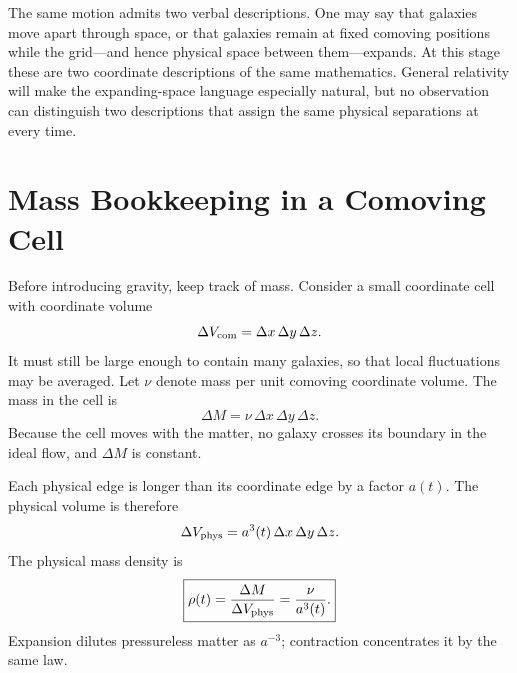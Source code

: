 \begin{classroomqa}
\end{classroomqa}

The same motion admits two verbal descriptions. One may say that galaxies move apart through space, or that galaxies remain at fixed comoving positions while the grid---and hence physical space between them---expands. At this stage these are two coordinate descriptions of the same mathematics. General relativity will make the expanding-space language especially natural, but no observation can distinguish two descriptions that assign the same physical separations at every time.

\section{Mass Bookkeeping in a Comoving Cell}

Before introducing gravity, keep track of mass. Consider a small coordinate cell with coordinate volume
\begin{equation}
\Delta V_{\rm com}=\Delta x\,\Delta y\,\Delta z.
\end{equation}
It must still be large enough to contain many galaxies, so that local fluctuations may be averaged. Let \(\nu\) denote mass per unit comoving coordinate volume. The mass in the cell is
\begin{equation}
\Delta M=\nu\,\Delta x\,\Delta y\,\Delta z.
\label{eq:c01-comoving-mass}
\end{equation}
Because the cell moves with the matter, no galaxy crosses its boundary in the ideal flow, and \(\Delta M\) is constant.

Each physical edge is longer than its coordinate edge by a factor \(a(t)\). The physical volume is therefore
\begin{equation}
\Delta V_{\rm phys}=a^3(t)\,\Delta x\,\Delta y\,\Delta z.
\end{equation}
The physical mass density is
\begin{equation}
\boxed{\rho(t)=\frac{\Delta M}{\Delta V_{\rm phys}}=\frac{\nu}{a^3(t)}.}
\label{eq:c01-density-dilution}
\end{equation}
Expansion dilutes pressureless matter as \(a^{-3}\); contraction concentrates it by the same law.

